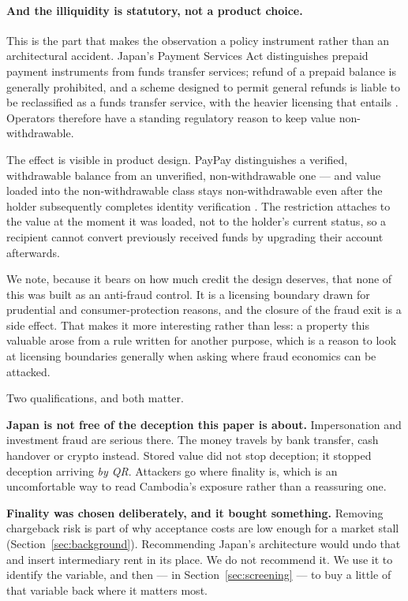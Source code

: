 \documentclass[10pt,a4paper,twocolumn]{article}
\begin{document}
\paragraph{And the illiquidity is statutory, not a product choice.}
This is the part that makes the observation a policy instrument rather than an
architectural accident. Japan's Payment Services Act distinguishes prepaid
payment instruments from funds transfer services; refund of a prepaid balance is
generally prohibited, and a scheme designed to permit general refunds is liable
to be reclassified as a funds transfer service, with the heavier licensing that
entails \citep{jpsa}. Operators therefore have a standing regulatory reason to
keep value non-withdrawable.

The effect is visible in product design. PayPay distinguishes a verified,
withdrawable balance from an unverified, non-withdrawable one --- and value loaded
into the non-withdrawable class stays non-withdrawable even after the holder
subsequently completes identity verification \citep{paypaybalance}. The
restriction attaches to the value at the moment it was loaded, not to the
holder's current status, so a recipient cannot convert previously received funds
by upgrading their account afterwards.

We note, because it bears on how much credit the design deserves, that none of
this was built as an anti-fraud control. It is a licensing boundary drawn for
prudential and consumer-protection reasons, and the closure of the fraud exit is
a side effect. That makes it more interesting rather than less: a property this
valuable arose from a rule written for another purpose, which is a reason to
look at licensing boundaries generally when asking where fraud economics can be
attacked.

\noindent Two qualifications, and both matter.

\textbf{Japan is not free of the deception this paper is about.} Impersonation
and investment fraud are serious there. The money travels by bank transfer, cash
handover or crypto instead. Stored value did not stop deception; it stopped
deception arriving \emph{by QR}. Attackers go where finality is, which is an
uncomfortable way to read Cambodia's exposure rather than a reassuring one.

\textbf{Finality was chosen deliberately, and it bought something.} Removing
chargeback risk is part of why acceptance costs are low enough for a market
stall (Section~\ref{sec:background}). Recommending Japan's architecture would
undo that and insert intermediary rent in its place. We do not recommend it. We
use it to identify the variable, and then --- in Section~\ref{sec:screening} --- to
buy a little of that variable back where it matters most.
\end{document}
